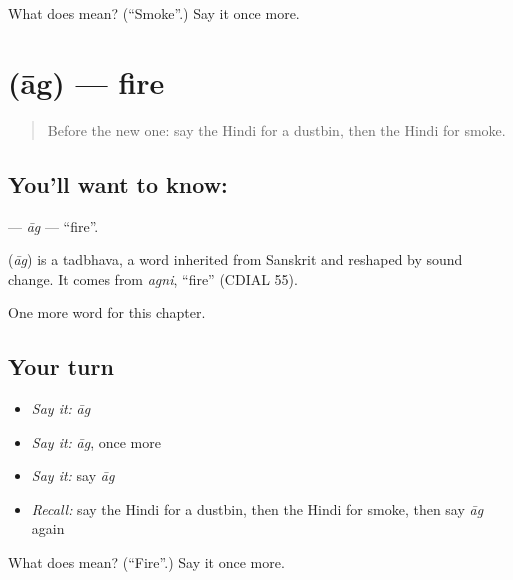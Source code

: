 \begin{tcolorbox}[breakable,colback=teal!4,colframe=teal!35!black,title={Before you move on}]
What does  mean? (\textquotedblleft{}Smoke\textquotedblright{}.) Say it once more.
\end{tcolorbox}
\section[\texorpdfstring{\hi{आग} (āg)}{आग (āg)}]{ (āg) — fire}

\label{lesson:HI-C268-ag}



\begin{quote}
Before the new one: say the Hindi for a dustbin, then the Hindi for smoke.
\end{quote}

\subsection*{You'll want to know: }
\textbf{} — \emph{āg} — \textquotedblleft{}fire\textquotedblright{}.

\begin{cousinweb}
\textbf{} (\emph{āg}) is a tadbhava, a word inherited from Sanskrit and reshaped by sound change. It comes from \emph{agni}, \textquotedblleft{}fire\textquotedblright{} (CDIAL 55).
\end{cousinweb}

\begin{grammarlens}[title={What you've built}]
One more word for this chapter.
\end{grammarlens}

\subsection*{Your turn}
\begin{itemize}
\raggedright
  \item \emph{Say it:} \emph{āg}
  \item \emph{Say it:} \emph{āg}, once more
  \item \emph{Say it:} say \emph{āg}
  \item \emph{Recall:} say the Hindi for a dustbin, then the Hindi for smoke, then say \emph{āg} again
\end{itemize}

\begin{tcolorbox}[breakable,colback=teal!4,colframe=teal!35!black,title={Before you move on}]
What does  mean? (\textquotedblleft{}Fire\textquotedblright{}.) Say it once more.
\end{tcolorbox}
